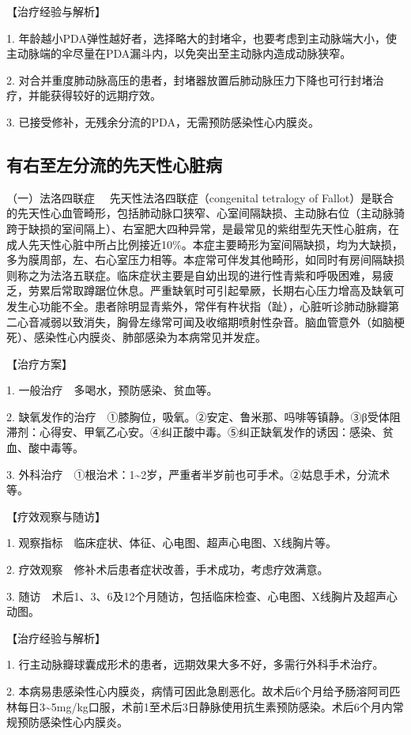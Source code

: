 【治疗经验与解析】

1.
年龄越小PDA弹性越好者，选择略大的封堵伞，也要考虑到主动脉端大小，使主动脉端的伞尽量在PDA漏斗内，以免突出至主动脉内造成动脉狭窄。

2.
对合并重度肺动脉高压的患者，封堵器放置后肺动脉压力下降也可行封堵治疗，并能获得较好的远期疗效。

3. 已接受修补，无残余分流的PDA，无需预防感染性心内膜炎。

\subsection{有右至左分流的先天性心脏病}

{（一）法洛四联症} 　先天性法洛四联症（congenital tetralogy of
Fallot）是联合的先天性心血管畸形，包括肺动脉口狭窄、心室间隔缺损、主动脉右位（主动脉骑跨于缺损的室间隔上）、右室肥大四种异常，是最常见的紫绀型先天性心脏病，在成人先天性心脏中所占比例接近10\%。本症主要畸形为室间隔缺损，均为大缺损，多为膜周部，左、右心室压力相等。本症常可伴发其他畸形，如同时有房间隔缺损则称之为法洛五联症。临床症状主要是自幼出现的进行性青紫和呼吸困难，易疲乏，劳累后常取蹲踞位休息。严重缺氧时可引起晕厥，长期右心压力增高及缺氧可发生心功能不全。患者除明显青紫外，常伴有杵状指（趾），心脏听诊肺动脉瓣第二心音减弱以致消失，胸骨左缘常可闻及收缩期喷射性杂音。脑血管意外（如脑梗死）、感染性心内膜炎、肺部感染为本病常见并发症。

【治疗方案】

1. 一般治疗　多喝水，预防感染、贫血等。

2.
缺氧发作的治疗　①膝胸位，吸氧。②安定、鲁米那、吗啡等镇静。③β受体阻滞剂：心得安、甲氧乙心安。④纠正酸中毒。⑤纠正缺氧发作的诱因：感染、贫血、酸中毒等。

3.
外科治疗　①根治术：1\textasciitilde{}2岁，严重者半岁前也可手术。②姑息手术，分流术等。

【疗效观察与随访】

1. 观察指标　临床症状、体征、心电图、超声心电图、X线胸片等。

2. 疗效观察　修补术后患者症状改善，手术成功，考虑疗效满意。

3.
随访　术后1、3、6及12个月随访，包括临床检查、心电图、X线胸片及超声心动图。

【治疗经验与解析】

1. 行主动脉瓣球囊成形术的患者，远期效果大多不好，多需行外科手术治疗。

2.
本病易患感染性心内膜炎，病情可因此急剧恶化。故术后6个月给予肠溶阿司匹林每日3\textasciitilde{}5mg/kg口服，术前1至术后3日静脉使用抗生素预防感染。术后6个月内常规预防感染性心内膜炎。

